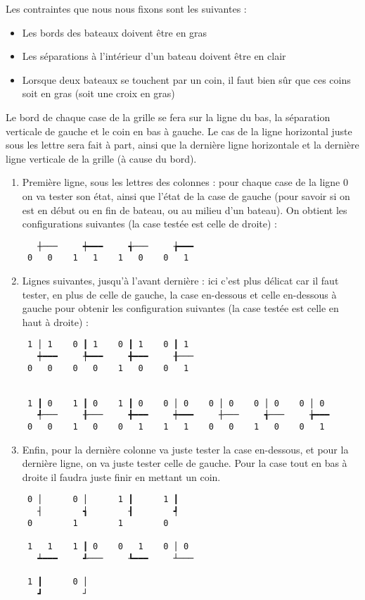 Les contraintes que nous nous fixons sont les suivantes :
\begin{itemize}
\item Les bords des bateaux doivent être en gras
\item Les séparations à l'intérieur d'un bateau doivent être en clair
\item Lorsque deux bateaux se touchent par un coin, il faut bien sûr que ces coins soit en gras (soit une croix en gras)
\end{itemize}


Le bord de chaque case de la grille se fera sur la ligne du bas, la séparation verticale de gauche et le coin en bas à gauche. Le cas de la ligne horizontal juste sous les lettre sera fait à part, ainsi que la dernière ligne horizontale et la dernière ligne verticale de la grille (à cause du bord).

\begin{enumerate}
\item Première ligne, sous les lettres des colonnes : pour chaque case de la ligne $0$ on va tester son état, ainsi que l'état de la case de gauche (pour savoir si on est en début ou en fin de bateau, ou au milieu d'un bateau). On obtient les configurations suivantes (la case testée est celle de droite) :

\begin{verbatim}
   ┼───     ┿━━━     ╅───     ╆━━━
 0   0    1   1    1   0    0   1
\end{verbatim}


\item Lignes suivantes, jusqu'à l'avant dernière : ici c'est plus délicat car il faut tester, en plus de celle de gauche, la case en-dessous et celle en-dessous à gauche pour obtenir les configuration suivantes (la case testée est celle en haut à droite) :

\begin{verbatim}
 1 │ 1    0 ┃ 1    0 ┃ 1    0 ┃ 1
   ┿━━━     ╄━━━     ╋━━━     ╂───
 0   0    0   0    1   0    0   1
  
 
 1 ┃ 0    1 ┃ 0    1 ┃ 0    0 │ 0    0 │ 0    0 │ 0    0 │ 0
   ╃───     ╂───     ╋━━━     ┿━━━     ┼───     ╅───     ╆━━━
 0   0    1   0    0   1    1   1    0   0    1   0    0   1
\end{verbatim}

\item Enfin, pour la dernière colonne va juste tester la case en-dessous, et pour la dernière ligne, on va juste tester celle de gauche. Pour la case tout en bas à droite il faudra juste finir en mettant un coin.

\begin{verbatim}
 0 │      0 │      1 ┃      1 ┃  
   ┤        ┪        ┨        ┩
 0        1        1        0
 
 1   1    1 ┃ 0    0   1    0 │ 0
   ┷━━━     ┹───     ┺━━━     ┴───

 1 ┃      0 │
   ┛        ┘
\end{verbatim}
\end{enumerate}

